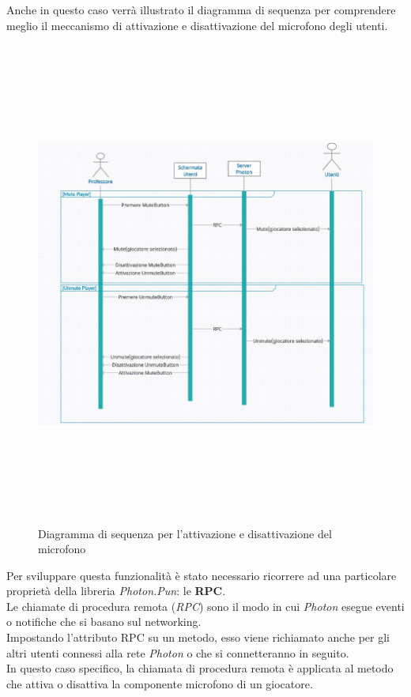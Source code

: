 Anche in questo caso verrà illustrato il diagramma di sequenza per comprendere meglio il meccanismo di attivazione e disattivazione del microfono degli utenti.
    \begin{figure}[H]
    \centering
    \includegraphics[width = 16cm, height = 16cm]{Immagini/muteunmutediag.jpg}
    \caption{Diagramma di sequenza per l'attivazione e disattivazione del microfono}
    \label{fig:my_label}
\end{figure}
\hspace{-0.6cm}Per sviluppare questa funzionalità è stato necessario ricorrere ad una particolare proprietà della libreria \textit{Photon.Pun}: le \textbf{RPC}.
\\Le chiamate di procedura remota (\textit{RPC}) sono il modo in cui \textit{Photon} esegue eventi o notifiche che si basano sul networking.
\\Impostando l'attributo RPC su un metodo, esso viene richiamato anche per gli altri utenti connessi alla rete \textit{Photon} o che si connetteranno in seguito.
\\In questo caso specifico, la chiamata di procedura remota è applicata al metodo che attiva o disattiva la componente microfono di un giocatore.